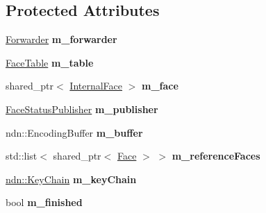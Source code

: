 \subsection*{Protected Attributes}
\begin{DoxyCompactItemize}
\item 
\hyperlink{classnfd_1_1Forwarder}{Forwarder} {\bfseries m\+\_\+forwarder}\hypertarget{classnfd_1_1tests_1_1FaceStatusPublisherFixture_ad8d3c9a0dc0128ce4942c4a644efadb2}{}\label{classnfd_1_1tests_1_1FaceStatusPublisherFixture_ad8d3c9a0dc0128ce4942c4a644efadb2}

\item 
\hyperlink{classnfd_1_1FaceTable}{Face\+Table} {\bfseries m\+\_\+table}\hypertarget{classnfd_1_1tests_1_1FaceStatusPublisherFixture_a10b2a5990153c96070ebc5ade69e251c}{}\label{classnfd_1_1tests_1_1FaceStatusPublisherFixture_a10b2a5990153c96070ebc5ade69e251c}

\item 
shared\+\_\+ptr$<$ \hyperlink{classnfd_1_1InternalFace}{Internal\+Face} $>$ {\bfseries m\+\_\+face}\hypertarget{classnfd_1_1tests_1_1FaceStatusPublisherFixture_a5d89eea61c76483397b8ff6fcf2f9b34}{}\label{classnfd_1_1tests_1_1FaceStatusPublisherFixture_a5d89eea61c76483397b8ff6fcf2f9b34}

\item 
\hyperlink{classnfd_1_1FaceStatusPublisher}{Face\+Status\+Publisher} {\bfseries m\+\_\+publisher}\hypertarget{classnfd_1_1tests_1_1FaceStatusPublisherFixture_a500e27b875a78c3257488b0f38e4055a}{}\label{classnfd_1_1tests_1_1FaceStatusPublisherFixture_a500e27b875a78c3257488b0f38e4055a}

\item 
ndn\+::\+Encoding\+Buffer {\bfseries m\+\_\+buffer}\hypertarget{classnfd_1_1tests_1_1FaceStatusPublisherFixture_af8fe94afe2a3f23a08e463422a1cc093}{}\label{classnfd_1_1tests_1_1FaceStatusPublisherFixture_af8fe94afe2a3f23a08e463422a1cc093}

\item 
std\+::list$<$ shared\+\_\+ptr$<$ \hyperlink{classnfd_1_1Face}{Face} $>$ $>$ {\bfseries m\+\_\+reference\+Faces}\hypertarget{classnfd_1_1tests_1_1FaceStatusPublisherFixture_ae2ffee13f3f9f9e1a77a559a71b3a7e7}{}\label{classnfd_1_1tests_1_1FaceStatusPublisherFixture_ae2ffee13f3f9f9e1a77a559a71b3a7e7}

\item 
\hyperlink{classndn_1_1security_1_1KeyChain}{ndn\+::\+Key\+Chain} {\bfseries m\+\_\+key\+Chain}\hypertarget{classnfd_1_1tests_1_1FaceStatusPublisherFixture_a56491e9597fdd65d2a5c681368e1d3c6}{}\label{classnfd_1_1tests_1_1FaceStatusPublisherFixture_a56491e9597fdd65d2a5c681368e1d3c6}

\item 
bool {\bfseries m\+\_\+finished}\hypertarget{classnfd_1_1tests_1_1FaceStatusPublisherFixture_ac9fb15c2698bbf4593dfa8125a01fd22}{}\label{classnfd_1_1tests_1_1FaceStatusPublisherFixture_ac9fb15c2698bbf4593dfa8125a01fd22}

\end{DoxyCompactItemize}


